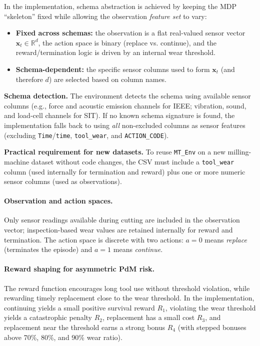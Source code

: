 \documentclass[sn-basic]{sn-jnl} %
\begin{document}
In the implementation, schema abstraction is achieved by keeping the MDP ``skeleton'' fixed while allowing the observation \emph{feature set} to vary:
\begin{itemize}
	\item \textbf{Fixed across schemas:} the observation is a flat real-valued sensor vector $\mathbf{x}_t\in\mathbb{R}^d$, the action space is binary (replace vs. continue), and the reward/termination logic is driven by an internal wear threshold.
	\item \textbf{Schema-dependent:} the specific sensor columns used to form $\mathbf{x}_t$ (and therefore $d$) are selected based on column names.
\end{itemize}

\textbf{Schema detection.}
The environment detects the schema using available sensor columns (e.g., force and acoustic emission channels for IEEE; vibration, sound, and load-cell channels for SIT). If no known schema signature is found, the implementation falls back to using \emph{all} non-excluded columns as sensor features (excluding \texttt{Time}/\texttt{time}, \texttt{tool\_wear}, and \texttt{ACTION\_CODE}).

\textbf{Practical requirement for new datasets.}
To reuse \texttt{MT\_Env} on a new milling-machine dataset without code changes, the CSV must include a \texttt{tool\_wear} column (used internally for termination and reward) plus one or more numeric sensor columns (used as observations).

\paragraph{Observation and action spaces.}
Only sensor readings available during cutting are included in the observation vector; inspection-based wear values are retained internally for reward and termination. The action space is discrete with two actions: $a=0$ means \emph{replace} (terminates the episode) and $a=1$ means \emph{continue}.

\paragraph{Reward shaping for asymmetric PdM risk.}
The reward function encourages long tool use without threshold violation, while rewarding timely replacement close to the wear threshold. In the implementation, continuing yields a small positive survival reward $R_1$, violating the wear threshold yields a catastrophic penalty $R_2$, replacement has a small cost $R_3$, and replacement near the threshold earns a strong bonus $R_4$ (with stepped bonuses above 70\%, 80\%, and 90\% wear ratio).
\end{document}
